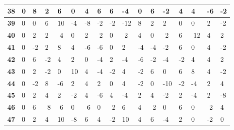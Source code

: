 \begin{longtable}[c]{|l|l|l|l|l|l|l|l|l|l|l|l|l|l|l|l|l|}
\textbf{38} & 0          & 8          & 2          & 6          & 0          & 4          & 6          & 6          & -4         & 0          & 6           & -2          & 4           & 4           & -6          & -2          \\ \hline
\textbf{39} & 0          & 0          & 6          & 10         & -4         & -8         & -2         & -2         & -12        & 8          & 2           & 2           & 0           & 0           & 2           & -2          \\ \hline
\textbf{40} & 0          & 2          & 2          & -4         & 0          & 2          & -2         & 0          & -2         & 4          & 0           & -2          & 6           & -12         & 4           & 2           \\ \hline
\textbf{41} & 0          & -2         & 2          & 8          & 4          & -6         & -6         & 0          & 2          & -4         & -4          & -2          & 6           & 0           & 4           & -2          \\ \hline
\textbf{42} & 0          & 6          & -2         & 4          & 2          & 0          & -4         & 2          & -4         & -6         & -2          & -4          & -2          & 4           & 4           & 2           \\ \hline
\textbf{43} & 0          & 2          & -2         & 0          & 10         & 4          & -4         & -2         & 4          & -2         & 6           & 0           & 6           & 8           & 4           & -2          \\ \hline
\textbf{44} & 0          & -2         & 8          & -6         & 2          & 4          & 2          & 0          & 4          & -2         & 0           & -10         & -2          & -4          & 2           & 4           \\ \hline
\textbf{45} & 0          & 2          & 4          & 2          & -2         & 4          & -6         & 4          & -4         & 2          & 4           & -2          & 2           & -4          & 2           & -8          \\ \hline
\textbf{46} & 0          & 6          & -8         & -6         & 0          & -6         & 0          & -2         & 6          & 4          & -2          & 0           & 6           & 0           & -2          & 4           \\ \hline
\textbf{47} & 0          & 2          & 4          & 10         & -8         & 6          & 4          & -2         & 10         & 4          & 6           & -4          & 2           & 0           & -2          & 0           \\ \hline

\end{longtable}
